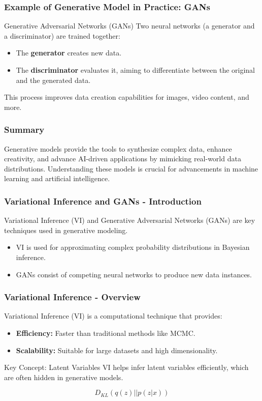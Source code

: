 \documentclass[aspectratio=169]{beamer}
\begin{document}
\begin{frame}[fragile]
    \frametitle{Example of Generative Model in Practice: GANs}
    \begin{block}{Generative Adversarial Networks (GANs)}
        Two neural networks (a generator and a discriminator) are trained together:
        \begin{itemize}
            \item The \textbf{generator} creates new data.
            \item The \textbf{discriminator} evaluates it, aiming to differentiate between the original and the generated data.
        \end{itemize}
        This process improves data creation capabilities for images, video content, and more.
    \end{block}
\end{frame}

\begin{frame}[fragile]
    \frametitle{Summary}
    Generative models provide the tools to synthesize complex data, enhance creativity, and advance AI-driven applications by mimicking real-world data distributions. Understanding these models is crucial for advancements in machine learning and artificial intelligence.
\end{frame}

\begin{frame}[fragile]
    \frametitle{Variational Inference and GANs - Introduction}
    Variational Inference (VI) and Generative Adversarial Networks (GANs) are key techniques used in generative modeling.

    \begin{itemize}
        \item VI is used for approximating complex probability distributions in Bayesian inference.
        \item GANs consist of competing neural networks to produce new data instances.
    \end{itemize}
\end{frame}

\begin{frame}[fragile]
    \frametitle{Variational Inference - Overview}
    Variational Inference (VI) is a computational technique that provides:
    
    \begin{itemize}
        \item \textbf{Efficiency:} Faster than traditional methods like MCMC.
        \item \textbf{Scalability:} Suitable for large datasets and high dimensionality.
    \end{itemize}

    \begin{block}{Key Concept: Latent Variables}
        VI helps infer latent variables efficiently, which are often hidden in generative models.
    \end{block}
    
    \begin{equation}
        D_{KL}(q(z) || p(z|x))
    \end{equation}
\end{frame}
\end{document}
